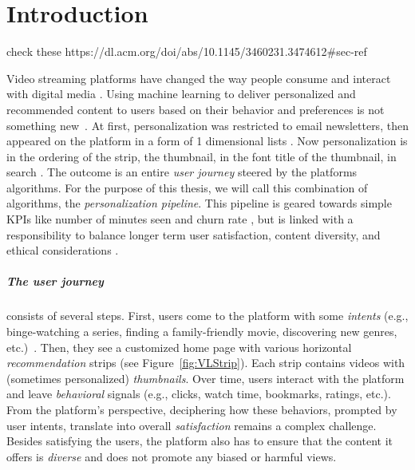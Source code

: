 
\chapter{Introduction}
\label{chapter:introduction}


check these https://dl.acm.org/doi/abs/10.1145/3460231.3474612\#sec-ref \tocite{}

Video streaming platforms have changed the way people consume and interact with digital media \tocite{}. Using machine learning to deliver personalized and recommended content to users based on their behavior and preferences is not something new~\cite{oldPersonalizationBehavior, oldPersonalizationSearch}. At first, personalization was restricted to email newsletters, then appeared on the platform in a form of 1 dimensional lists \tocite{}. Now personalization is in the ordering of the strip, the thumbnail, in the font title of the thumbnail, in search \tocite{}. The outcome is an entire \emph{user journey} steered by the platforms algorithms. For the purpose of this thesis, we will call this combination of algorithms, the \emph{personalization pipeline}. This pipeline is geared towards simple KPIs like number of minutes seen \tocite{} and churn rate \tocite{}, but is linked with a responsibility to balance longer term user satisfaction, content diversity, and ethical considerations \tocite{}.

\paragraph{The user journey} consists of several steps. First, users come to the platform with some \emph{intents} (e.g., binge-watching a series, finding a family-friendly movie, discovering new genres, etc.)~\cite{intent}. Then, they see a customized home page with various horizontal \emph{recommendation} strips (see Figure~\ref{fig:VLStrip}). Each strip contains videos with (sometimes personalized) \emph{thumbnails}. Over time, users interact with the platform and leave \emph{behavioral} signals (e.g., clicks, watch time, bookmarks, ratings, etc.). From the platform's perspective, deciphering how these behaviors, prompted by user intents, translate into overall \emph{satisfaction} remains a complex challenge. Besides satisfying the users, the platform also has to ensure that the content it offers is \emph{diverse} and does not promote any biased or harmful views.

